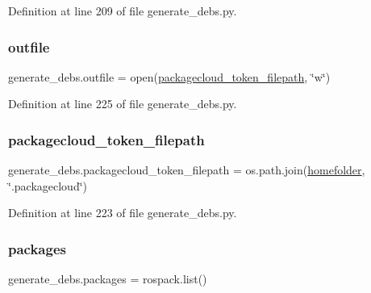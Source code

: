 Definition at line 209 of file generate\+\_\+debs.\+py.

\mbox{\label{namespacegenerate__debs_aa1faa039b35b72ee44dc6f106ad12911}} 
\subsubsection{\texorpdfstring{outfile}{outfile}}
{\footnotesize\ttfamily generate\+\_\+debs.\+outfile = open(\hyperlink{namespacegenerate__debs_a836a20b989c3c8e46255d91d10cb524f}{packagecloud\+\_\+token\+\_\+filepath}, \char`\"{}w\char`\"{})}



Definition at line 225 of file generate\+\_\+debs.\+py.

\mbox{\label{namespacegenerate__debs_a836a20b989c3c8e46255d91d10cb524f}} 
\subsubsection{\texorpdfstring{packagecloud\+\_\+token\+\_\+filepath}{packagecloud\_token\_filepath}}
{\footnotesize\ttfamily generate\+\_\+debs.\+packagecloud\+\_\+token\+\_\+filepath = os.\+path.\+join(\hyperlink{namespacegenerate__debs_aeb83979be2939a8059435a906a91f682}{homefolder}, \char`\"{}.packagecloud\char`\"{})}



Definition at line 223 of file generate\+\_\+debs.\+py.

\mbox{\label{namespacegenerate__debs_a40d4732827c5678f3f48354238245e1d}} 
\subsubsection{\texorpdfstring{packages}{packages}}
{\footnotesize\ttfamily generate\+\_\+debs.\+packages = rospack.\+list()}



